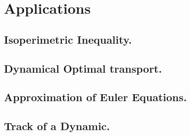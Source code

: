 \chapter{Applications}
\section{Isoperimetric Inequality.}
\section{Dynamical Optimal transport.}
\section{Approximation of Euler Equations.}
\section{Track of a Dynamic.}


